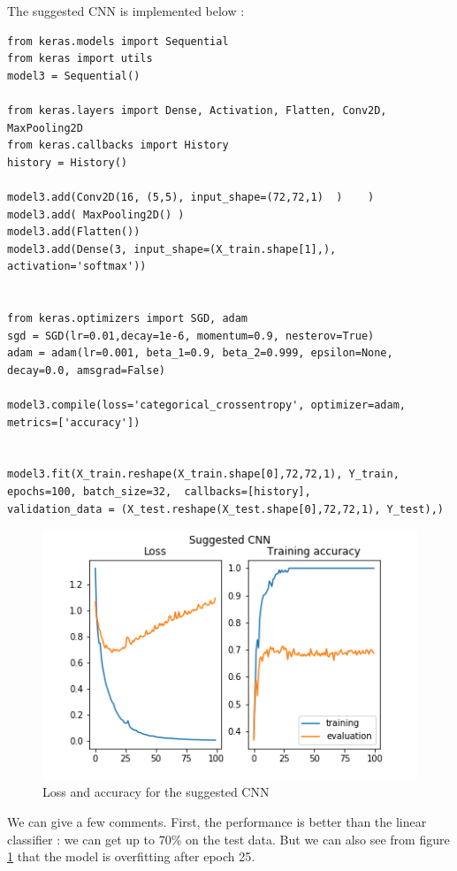 \documentclass[]{article}
\begin{document}
The suggested CNN is implemented below :

\begin{verbatim}
from keras.models import Sequential 
from keras import utils
model3 = Sequential()

from keras.layers import Dense, Activation, Flatten, Conv2D, MaxPooling2D
from keras.callbacks import History 
history = History()

model3.add(Conv2D(16, (5,5), input_shape=(72,72,1)  )    )
model3.add( MaxPooling2D() )
model3.add(Flatten())
model3.add(Dense(3, input_shape=(X_train.shape[1],), activation='softmax'))


from keras.optimizers import SGD, adam
sgd = SGD(lr=0.01,decay=1e-6, momentum=0.9, nesterov=True) 
adam = adam(lr=0.001, beta_1=0.9, beta_2=0.999, epsilon=None, decay=0.0, amsgrad=False)

model3.compile(loss='categorical_crossentropy', optimizer=adam,  metrics=['accuracy'])


model3.fit(X_train.reshape(X_train.shape[0],72,72,1), Y_train, 
epochs=100, batch_size=32,  callbacks=[history], 
validation_data = (X_test.reshape(X_test.shape[0],72,72,1), Y_test),)
\end{verbatim}


\begin{figure}[h!]
	
	\includegraphics{figures/part3_cnn}
	\caption{Loss and accuracy for the suggested CNN}
	 \label{suggcnn}
\end{figure}

We can give a few comments. First, the performance is better than the linear classifier : we can get up to 70\% on the test data. But we can also see from figure \ref{suggcnn} that the model is overfitting after epoch 25. 
\end{document}
